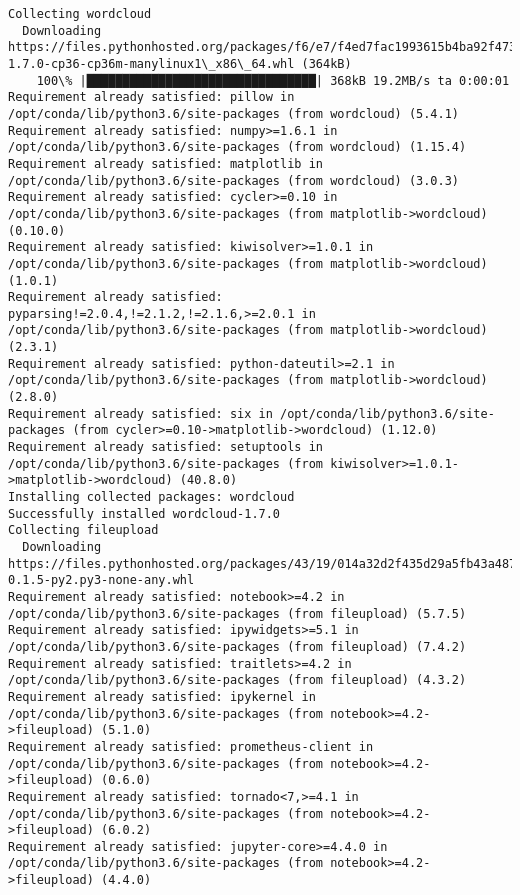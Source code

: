 \documentclass[11pt]{article}
\begin{document}
    \begin{Verbatim}[commandchars=\\\{\}]
Collecting wordcloud
  Downloading https://files.pythonhosted.org/packages/f6/e7/f4ed7fac1993615b4ba92f473a77e27a3d210c5d23a000c2c98846963f9a/wordcloud-1.7.0-cp36-cp36m-manylinux1\_x86\_64.whl (364kB)
    100\% |████████████████████████████████| 368kB 19.2MB/s ta 0:00:01
Requirement already satisfied: pillow in /opt/conda/lib/python3.6/site-packages (from wordcloud) (5.4.1)
Requirement already satisfied: numpy>=1.6.1 in /opt/conda/lib/python3.6/site-packages (from wordcloud) (1.15.4)
Requirement already satisfied: matplotlib in /opt/conda/lib/python3.6/site-packages (from wordcloud) (3.0.3)
Requirement already satisfied: cycler>=0.10 in /opt/conda/lib/python3.6/site-packages (from matplotlib->wordcloud) (0.10.0)
Requirement already satisfied: kiwisolver>=1.0.1 in /opt/conda/lib/python3.6/site-packages (from matplotlib->wordcloud) (1.0.1)
Requirement already satisfied: pyparsing!=2.0.4,!=2.1.2,!=2.1.6,>=2.0.1 in /opt/conda/lib/python3.6/site-packages (from matplotlib->wordcloud) (2.3.1)
Requirement already satisfied: python-dateutil>=2.1 in /opt/conda/lib/python3.6/site-packages (from matplotlib->wordcloud) (2.8.0)
Requirement already satisfied: six in /opt/conda/lib/python3.6/site-packages (from cycler>=0.10->matplotlib->wordcloud) (1.12.0)
Requirement already satisfied: setuptools in /opt/conda/lib/python3.6/site-packages (from kiwisolver>=1.0.1->matplotlib->wordcloud) (40.8.0)
Installing collected packages: wordcloud
Successfully installed wordcloud-1.7.0
Collecting fileupload
  Downloading https://files.pythonhosted.org/packages/43/19/014a32d2f435d29a5fb43a487d42a9afa2c188df56d152306de11a112178/fileupload-0.1.5-py2.py3-none-any.whl
Requirement already satisfied: notebook>=4.2 in /opt/conda/lib/python3.6/site-packages (from fileupload) (5.7.5)
Requirement already satisfied: ipywidgets>=5.1 in /opt/conda/lib/python3.6/site-packages (from fileupload) (7.4.2)
Requirement already satisfied: traitlets>=4.2 in /opt/conda/lib/python3.6/site-packages (from fileupload) (4.3.2)
Requirement already satisfied: ipykernel in /opt/conda/lib/python3.6/site-packages (from notebook>=4.2->fileupload) (5.1.0)
Requirement already satisfied: prometheus-client in /opt/conda/lib/python3.6/site-packages (from notebook>=4.2->fileupload) (0.6.0)
Requirement already satisfied: tornado<7,>=4.1 in /opt/conda/lib/python3.6/site-packages (from notebook>=4.2->fileupload) (6.0.2)
Requirement already satisfied: jupyter-core>=4.4.0 in /opt/conda/lib/python3.6/site-packages (from notebook>=4.2->fileupload) (4.4.0)

\end{Verbatim}
\end{document}
